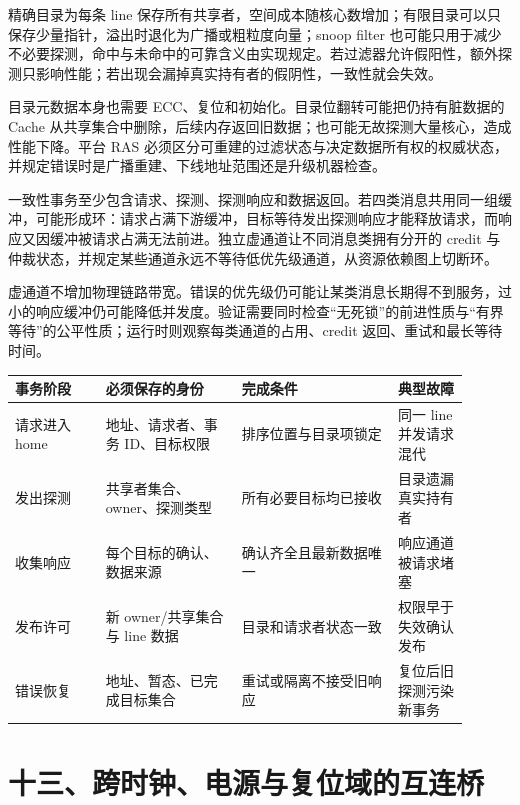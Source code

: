 
精确目录为每条 line 保存所有共享者，空间成本随核心数增加；有限目录可以只保存少量指针，溢出时退化为广播或粗粒度向量；snoop filter 也可能只用于减少不必要探测，命中与未命中的可靠含义由实现规定。若过滤器允许假阳性，额外探测只影响性能；若出现会漏掉真实持有者的假阴性，一致性就会失效。

目录元数据本身也需要 ECC、复位和初始化。目录位翻转可能把仍持有脏数据的 Cache 从共享集合中删除，后续内存返回旧数据；也可能无故探测大量核心，造成性能下降。平台 RAS 必须区分可重建的过滤状态与决定数据所有权的权威状态，并规定错误时是广播重建、下线地址范围还是升级机器检查。


一致性事务至少包含请求、探测、探测响应和数据返回。若四类消息共用同一组缓冲，可能形成环：请求占满下游缓冲，目标等待发出探测响应才能释放请求，而响应又因缓冲被请求占满无法前进。独立虚通道让不同消息类拥有分开的 credit 与仲裁状态，并规定某些通道永远不等待低优先级通道，从资源依赖图上切断环。

虚通道不增加物理链路带宽。错误的优先级仍可能让某类消息长期得不到服务，过小的响应缓冲仍可能降低并发度。验证需要同时检查“无死锁”的前进性质与“有界等待”的公平性质；运行时则观察每类通道的占用、credit 返回、重试和最长等待时间。

\begin{longtable}{L{0.18\linewidth}L{0.27\linewidth}L{0.31\linewidth}L{0.14\linewidth}}
\toprule
事务阶段 & 必须保存的身份 & 完成条件 & 典型故障 \\
\midrule
请求进入 home & 地址、请求者、事务 ID、目标权限 & 排序位置与目录项锁定 & 同一 line 并发请求混代 \\\tablerowrule
发出探测 & 共享者集合、owner、探测类型 & 所有必要目标均已接收 & 目录遗漏真实持有者 \\\tablerowrule
收集响应 & 每个目标的确认、数据来源 & 确认齐全且最新数据唯一 & 响应通道被请求堵塞 \\\tablerowrule
发布许可 & 新 owner/共享集合与 line 数据 & 目录和请求者状态一致 & 权限早于失效确认发布 \\\tablerowrule
错误恢复 & 地址、暂态、已完成目标集合 & 重试或隔离不接受旧响应 & 复位后旧探测污染新事务 \\
\bottomrule
\end{longtable}

\section{十三、跨时钟、电源与复位域的互连桥}

